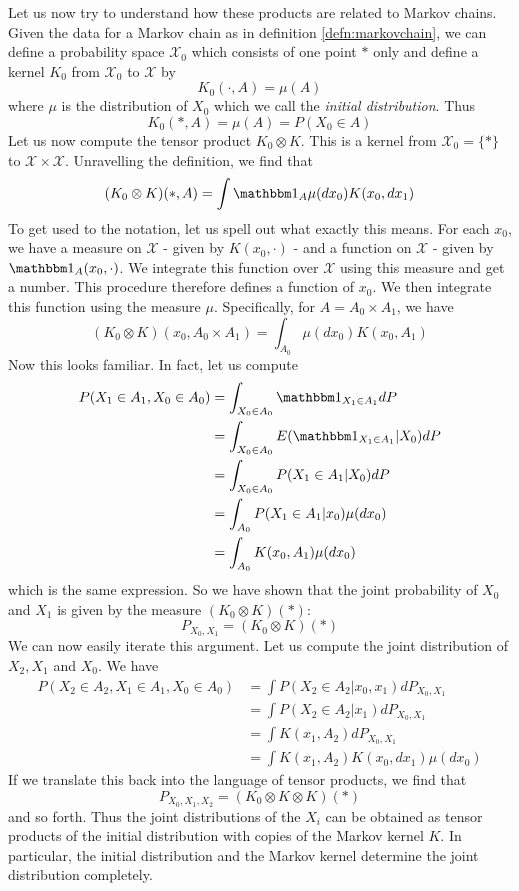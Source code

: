 \documentclass[a4paper, draft]{article}
\theoremstyle{own}
\theoremstyle{remark}
\begin{document}
Let us now try to understand how these products are related to Markov chains. Given the data for a Markov chain as in definition \ref{defn:markovchain}, we can define a probability space ${\mathcal X}_0$ which consists of one point $*$ only and define a kernel $K_0$ from ${\mathcal X}_0$ to ${\mathcal X}$ by 
$$
K_0(\cdot, A) = \mu(A)
$$
where $\mu$ is the distribution of $X_0$ which we call the {\em initial distribution}. Thus
$$
K_0(*, A) = \mu(A) = P(X_0 \in A)
$$
Let us now compute the tensor product $K_0 \otimes K$. This is a kernel from ${\mathcal X}_0 = \{*\}$ to ${\mathcal X}  \times {\mathcal X}$. Unravelling the definition, we find that
$$
(K_0 \otimes K)(*, A) = \int {\mathbbm 1}_A \mu(dx_0) K(x_0, dx_1)
$$
To get used to the notation, let us spell out what exactly this means. For each $x_0$, we have a measure on ${\mathcal X}$ - given by $K(x_0, \cdot)$ - and a function on ${\mathcal X}$ - given by ${\mathbbm 1}_A(x_0, \cdot)$. We integrate this function over ${\mathcal X}$ using this measure and get a number. This procedure therefore defines a function of $x_0$. We then integrate this function using the measure $\mu$. Specifically, for $A = A_0 \times A_1$, we have
$$
(K_0 \otimes K)(x_0, A_0 \times A_1) = \int_{A_0} \mu(dx_0) K(x_0, A_1)
$$
Now this looks familiar. In fact, let us compute
\begin{align*}
P(X_1 \in A_1, X_0 \in A_0) &= \int_{X_0 \in A_0} {\mathbbm 1}_{X_1 \in A_1} dP \\
&= \int_{X_0 \in A_0} E({\mathbbm 1}_{X_1 \in A_1} | X_0) dP \\
&= \int_{X_0 \in A_0} P(X_1 \in A_1 | X_0) dP \\
&= \int_{A_0} P(X_1 \in A_1 | x_0) \mu(dx_0) \\
&= \int_{A_0} K(x_0, A_1) \mu(dx_0) \\
\end{align*}
which is the same expression. So we have shown that the joint probability of $X_0$ and $X_1$ is given by the measure $(K_0 \otimes K)(*)$:
$$
P_{X_0, X_1} = (K_0 \otimes K)(*)
$$
We can now easily iterate this argument. Let us compute the joint distribution of $X_2, X_1$ and $X_0$. We have
\begin{align*}
P(X_2 \in A_2, X_1 \in A_1, X_0 \in A_0) &= \int P(X_2 \in A_2 | x_0, x_1) dP_{X_0, X_1} \\
&= \int P(X_2 \in A_2 | x_1) dP_{X_0, X_1} \\
&= \int K(x_1, A_2) dP_{X_0, X_1} \\
&= \int K(x_1, A_2) K(x_0, dx_1) \mu(dx_0)
\end{align*}
If we translate this back into the language of tensor products, we find that
$$
P_{X_0, X_1, X_2} = (K_0 \otimes K \otimes K)(*)
$$
and so forth. Thus the joint distributions of the $X_i$ can be obtained as tensor products of the initial distribution with copies of the Markov kernel $K$. In particular, the initial distribution and the Markov kernel determine the joint distribution completely. 
\end{document}
